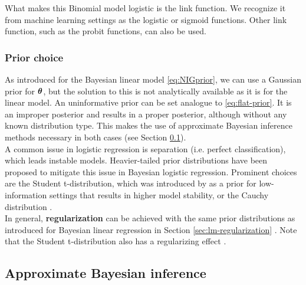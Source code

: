 What makes this Binomial model logistic is the link function. We recognize it from machine learning settings as the logistic or sigmoid functions. Other link function, such as the probit functions, can also be used.


\subsubsection*{Prior choice}

As introduced for the Bayesian linear model \eqref{eq:NIGprior}, we can use a Gaussian prior for $\bm{\theta}$, but the solution to this is not analytically available as it is for the linear model.
An uninformative prior can be set analogue to \eqref{eq:flat-prior}.
It is an improper posterior and results in a proper posterior, although without any known distribution type.
This makes the use of approximate Bayesian inference methods necessary in both cases (see Section \ref{sec:logit-inf}).\\

A common issue in logistic regression is separation (i.e. perfect classification), which leads instable models.
Heavier-tailed prior distributions have been proposed to mitigate this issue in Bayesian logistic regression.
Prominent choices are the Student t-distribution, which was introduced by \citet{gelman_weakly_2008} as a prior for low-information settings that results in higher model stability, or the Cauchy distribution . \\

In general, \textbf{regularization} can be achieved with the same prior distributions as introduced for Bayesian linear regression in Section \ref{sec:lm-regularization} .
Note that the Student t-distribution also has a regularizing effect \citep{gelman_weakly_2008}.


\subsection{Approximate Bayesian inference} \label{sec:logit-inf}

